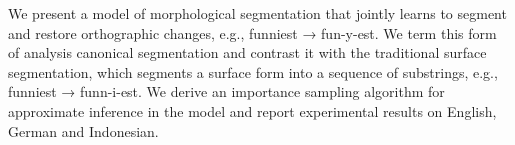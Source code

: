 We present a model of morphological segmentation that jointly learns to segment and restore orthographic changes, e.g., funniest → fun-y-est. We term this form of analysis canonical segmentation and contrast it with the traditional surface segmentation, which segments a surface form into a sequence of substrings, e.g., funniest → funn-i-est. We derive an importance sampling algorithm for approximate inference in the model and report experimental results on English, German and Indonesian.
